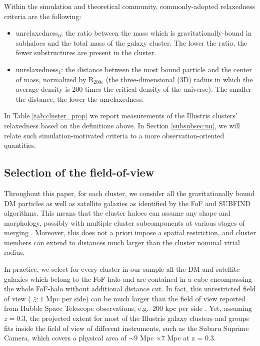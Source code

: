 \documentclass[usenatbib]{mn2e}
\begin{document}
{Within the simulation and theoretical community, commonly-adopted relaxedness criteria are the following:
\begin{itemize}
	\item unrelaxedness$_0$: the ratio between the mass which is gravitationally-bound in subhaloes and the total mass
		of the galaxy cluster. The lower the ratio, the fewer substructures
		are present in the cluster. 
	\item unrelaxedness$_1$: the distance between the most bound particle and
		the center of mass, normalized by R$_{200c}$ (the three-dimensional (3D) radius in which the
		average density is 200 times the critical density of the universe).
		The smaller the distance, the lower the unrelaxedness. 
\end{itemize}

In Table \ref{tab:cluster_prop} we report measurements of the Illustris clusters' relaxedness based on the definitions above. In Section \ref{subsubsec:nu}, we will relate such simulation-motivated criteria to a more observation-oriented quantities. 

\subsection{Selection of the field-of-view}
\label{sec:FOV}

Throughout this paper, for each cluster, we consider all the gravitationally bound DM particles as well as satellite galaxies as identified by the {\sc FoF} and {\sc SUBFIND} algorithms. This means that the cluster haloes can assume any shape and morphology, possibly with multiple cluster subcomponents at various stages of merging \citep[e.g.][]{Lukic:2009}. Moreover, this does not a priori impose a spatial restriction, and cluster members can extend to distances much larger than the cluster nominal virial radius.

In practice, we select for every cluster in our sample all the DM and satellite galaxies which belong to the FoF-halo and are contained in a cube encompassing the whole FoF-halo without additional distance cut.
In fact, this unrestricted field of view ($\gtrsim 1$ Mpc per side) can be much larger than
the field of view reported from Hubble Space Telescope 
observations, e.g. $~200$ kpc per side \citep{Zitrin2012a}. 
Yet, assuming $z = 0.3$, 
the projected extent for most of the Illustris galaxy clusters and groups
fits inside the field of view of different instruments, such as the Subaru Suprime Camera,
which covers a physical area of $\sim 9$ Mpc $\times 7$ Mpc at z = 0.3.

}
\end{document}
